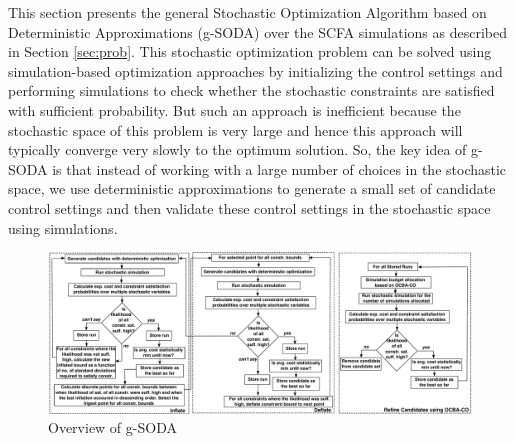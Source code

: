 \documentclass[a4paper, 12pt]{article} %
\begin{document}
This section presents the general Stochastic Optimization Algorithm based on Deterministic Approximations (g-SODA) over the SCFA simulations as described in Section \ref{sec:prob}. 
This stochastic optimization problem can be solved using simulation-based optimization approaches by initializing the control settings and performing simulations to check whether the stochastic constraints are satisfied with sufficient probability.
But such an approach is inefficient because the stochastic space of this problem is very large and hence this approach will typically converge very slowly to the optimum solution.
So, the key idea of g-SODA is that instead of working with a large number of choices in the stochastic space, we use deterministic approximations to generate a small set of candidate control settings and then validate these control settings in the stochastic space using simulations.


\begin{figure}[t]
	\includegraphics[width=\textwidth]{images/Algo_Full.pdf}
	\caption{Overview of g-SODA}
	\label{fig:algoOverview}       %
\end{figure}


\newcommand{\algoSODAm}{Algorithm 1}
\newcommand{\algoInflDefl}{Algorithm 2}
\newcommand{\algoPerfInfl}{Algorithm 3}
\newcommand{\algoInflate}{Algorithm 4}
\newcommand{\algoPerfDefl}{Algorithm 5}
\newcommand{\algoDeflate}{Algorithm 6}
\newcommand{\algoRefineCand}{Algorithm 7}
\newcommand{\algoExOCBA}{Algorithm 8}
\newcommand{\algoStochSim}{Algorithm 9}
\end{document}
